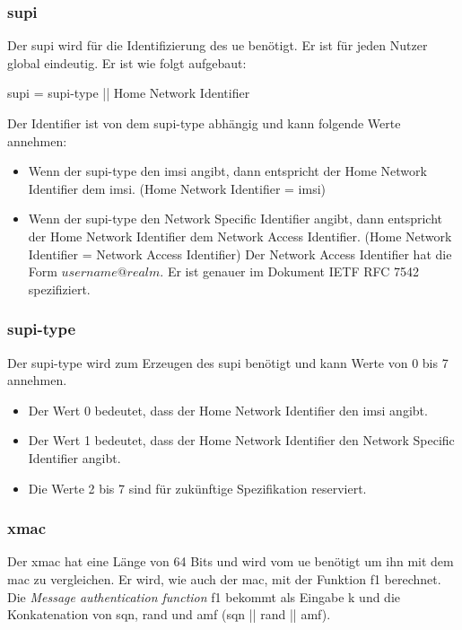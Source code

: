 \subsubsection{\gls{supi}}
Der \gls{supi} wird für die Identifizierung des \gls{ue} benötigt.
Er ist für jeden Nutzer global eindeutig. 
Er ist wie folgt aufgebaut: %

\gls{supi} = \gls{supi-type} || Home Network Identifier

Der Identifier ist von dem \gls{supi-type} abhängig und kann folgende Werte annehmen:

\begin{itemize}
\item Wenn der \gls{supi-type} den \gls{imsi} angibt, dann entspricht der Home Network Identifier dem \gls{imsi}. (Home Network Identifier = \gls{imsi})
\item Wenn der \gls{supi-type} den Network Specific Identifier angibt, dann entspricht der Home Network Identifier dem Network Access Identifier. (Home Network Identifier = Network Access Identifier)
Der Network Access Identifier hat die Form $ username@realm $. 
Er ist genauer im Dokument IETF RFC 7542 spezifiziert. %
\end{itemize}

\subsubsection{\gls{supi-type}}
Der \gls{supi-type} wird zum Erzeugen des \gls{supi} benötigt und kann Werte von 0 bis 7 annehmen. %
\begin{itemize}
\item Der Wert 0 bedeutet, dass der Home Network Identifier den \gls{imsi} angibt.
\item Der Wert 1 bedeutet, dass der Home Network Identifier den Network Specific Identifier angibt.
\item Die Werte 2 bis 7 sind für zukünftige Spezifikation reserviert.
\end{itemize}

\subsubsection{\gls{xmac}}
Der \gls{xmac} hat eine Länge von 64 Bits und wird vom \gls{ue} benötigt um ihn mit dem \gls{mac} zu vergleichen.
Er wird, wie auch der \gls{mac}, mit der Funktion f1 berechnet. %
Die \textit{Message authentication function} f1 bekommt als Eingabe \gls{k} und die Konkatenation von \gls{sqn}, \gls{rand} und \gls{amf} (\gls{sqn} || \gls{rand} || \gls{amf}). %

